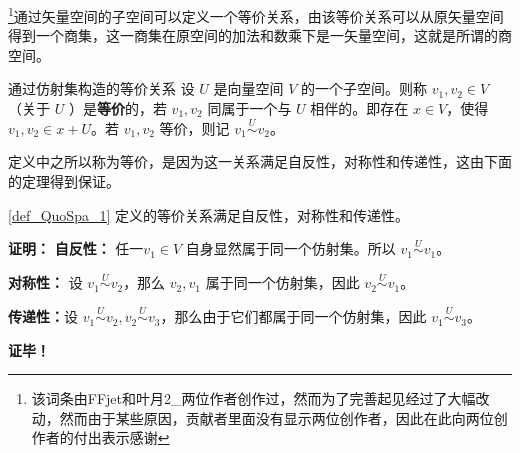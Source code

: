 




\footnote{该词条由FFjet和叶月2_两位作者创作过，然而为了完善起见经过了大幅改动，然而由于某些原因，贡献者里面没有显示两位创作者，因此在此向两位创作者的付出表示感谢}通过矢量空间的子空间可以定义一个等价关系，由该等价关系可以从原矢量空间得到一个商集，这一商集在原空间的加法和数乘下是一矢量空间，这就是所谓的商空间。


\begin{definition}{通过仿射集构造的等价关系}\label{def_QuoSpa_1}
设 $U$ 是向量空间 $V$ 的一个子空间。则称 $v_1,v_2\in V$ （关于 $U$ ）是\textbf{等价}的，若 $v_1,v_2$ 同属于一个与 $U$ 相伴的。即存在 $x\in V$，使得 $v_1,v_2\in x+U$。若 $v_1,v_2$ 等价，则记 $v_1\overset{U}{\sim}v_2$。 
\end{definition}
定义中之所以称为等价，是因为这一关系满足自反性，对称性和传递性，这由下面的定理得到保证。
\begin{theorem}{}
\autoref{def_QuoSpa_1} 定义的等价关系满足自反性，对称性和传递性。
\end{theorem}

\textbf{证明：}
\textbf{自反性：} 任一$v_1\in V$ 自身显然属于同一个仿射集。所以 $v_1\overset{U}{\sim} v_1$。

\textbf{对称性：} 设 $v_1\overset{U}{\sim} v_2$，那么 $v_2,v_1$ 属于同一个仿射集，因此 $v_2\overset{U}{\sim} v_1$。


\textbf{传递性：}设 $v_1\overset{U}{\sim} v_2,v_2\overset{U}{\sim} v_3$，那么由于它们都属于同一个仿射集，因此 $v_1\overset{U}{\sim} v_3$。

\textbf{证毕！}



